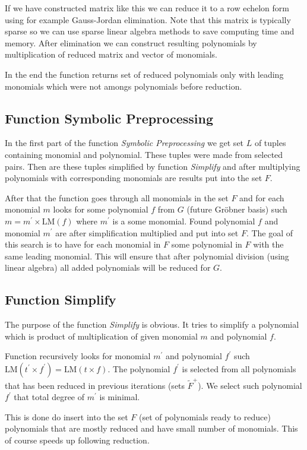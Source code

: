 If we have constructed matrix like this we can reduce it to a row echelon form using for example Gauss-Jordan elimination. Note that this matrix is typically sparse so we can use sparse linear algebra methods to save computing time and memory. After elimination we can construct resulting polynomials by multiplication of reduced matrix and vector of monomials.

In the end the function returns set of reduced polynomials only with leading monomials which were not amongs polynomials before reduction.

\subsection{Function Symbolic Preprocessing}
In the first part of the function \textit{Symbolic Preprocessing} we get set $L$ of tuples containing monomial and polynomial. These tuples were made from selected pairs. Then are these tuples simplified by function \textit{Simplify} and after multiplying polynomials with corresponding monomials are results put into the set $F$.

After that the function goes through all monomials in the set $F$ and for each monomial $m$ looks for some polynomial $f$ from $G$ (future Gr\"obner basis) such $m = m^\prime \times \textrm{LM}(f)$ where $m^\prime$ is a some monomial. Found polynomial $f$ and monomial $m^\prime$ are after simplification multiplied and put into set $F$. The goal of this search is to have for each monomial in $F$ some polynomial in $F$ with the same leading monomial. This will ensure that after polynomial division (using linear algebra) all added polynomials will be reduced for $G$.

\subsection{Function Simplify}
The purpose of the function \textit{Simplify} is obvious. It tries to simplify a polynomial which is product of multiplication of given monomial $m$ and polynomial $f$.

Function recursively looks for monomial $m^\prime$ and polynomial $f^\prime$ such $\textrm{LM}(t^\prime\times f^\prime) = \textrm{LM}(t\times f)$. The polynomial $f^\prime$ is selected from all polynomials that has been reduced in previous iterations (sets $\tilde{F}^+$). We select such polynomial $f^\prime$ that total degree of $m^\prime$ is minimal.

This is done do insert into the set $F$ (set of polynomials ready to reduce) polynomials that are mostly reduced and have small number of monomials. This of course speeds up following reduction.

